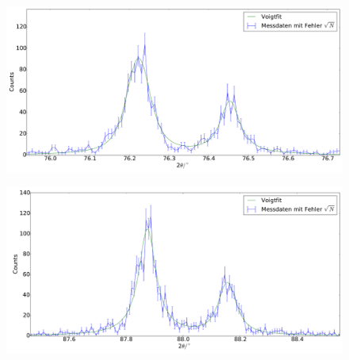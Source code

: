 \begin{figure}[H]
\begin{minipage}{.52\textwidth}
  \centering
  \includegraphics[scale=0.18]{messung_pulver_5}
  \label{fig:pul_mess_5}
\end{minipage}
\hspace{0.2cm}
\begin{minipage}{.52\textwidth}
  \centering
  \includegraphics[scale=0.18]{messung_pulver_6}
  \label{fig:pul_mess_6}
\end{minipage}
\end{figure}

